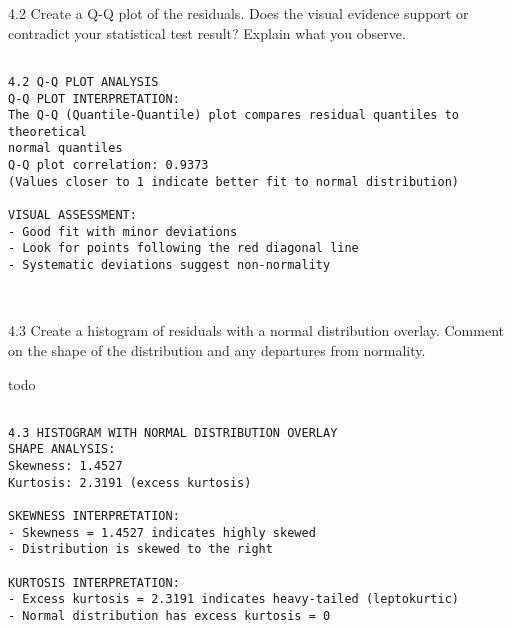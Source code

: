 \documentclass[11pt, twocolumn]{article}
\begin{document}
    4.2 Create a Q-Q plot of the residuals. Does the visual evidence support
or contradict your statistical test result? Explain what you observe.

    \begin{Verbatim}[commandchars=\\\{\}]

4.2 Q-Q PLOT ANALYSIS
Q-Q PLOT INTERPRETATION:
The Q-Q (Quantile-Quantile) plot compares residual quantiles to theoretical
normal quantiles
Q-Q plot correlation: 0.9373
(Values closer to 1 indicate better fit to normal distribution)

VISUAL ASSESSMENT:
- Good fit with minor deviations
- Look for points following the red diagonal line
- Systematic deviations suggest non-normality
    \end{Verbatim}

    \begin{center}
    \end{center}
    { \hspace*{\fill} \\}
    
    4.3 Create a histogram of residuals with a normal distribution overlay.
Comment on the shape of the distribution and any departures from
normality.

todo

    \begin{Verbatim}[commandchars=\\\{\}]

4.3 HISTOGRAM WITH NORMAL DISTRIBUTION OVERLAY
SHAPE ANALYSIS:
Skewness: 1.4527
Kurtosis: 2.3191 (excess kurtosis)

SKEWNESS INTERPRETATION:
- Skewness = 1.4527 indicates highly skewed
- Distribution is skewed to the right

KURTOSIS INTERPRETATION:
- Excess kurtosis = 2.3191 indicates heavy-tailed (leptokurtic)
- Normal distribution has excess kurtosis = 0
    \end{Verbatim}

    \begin{center}
    \end{center}
    { \hspace*{\fill} \\}
    
\end{document}

